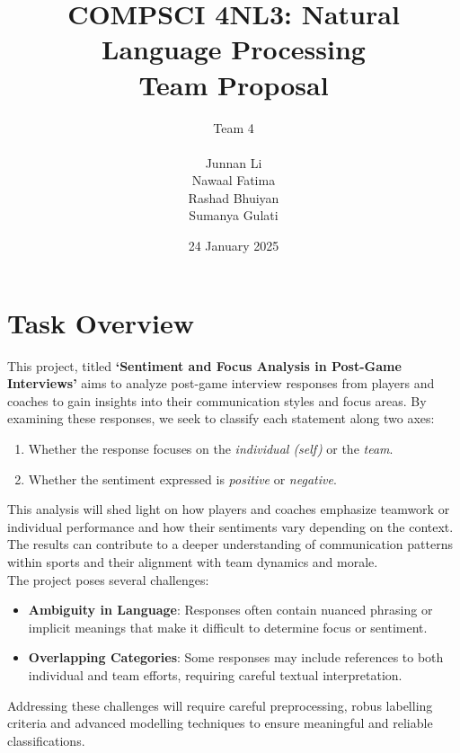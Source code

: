 \documentclass[titlepage]{article}
\title{COMPSCI 4NL3: Natural Language Processing\\
Team Proposal}
\author{Team 4\\
\\ Junnan Li
\\ Nawaal Fatima
\\ Rashad Bhuiyan
\\ Sumanya Gulati}
\date{24 January 2025}
\begin{document}
\begin{titlepage}
  \maketitle
\end{titlepage}

\newpage 

\tableofcontents
\listoftables

\newpage

\section{Task Overview}
This project, titled \textbf{`Sentiment and Focus Analysis in Post-Game Interviews'} aims to analyze post-game 
interview responses from players and coaches to gain insights into their communication styles and focus areas.
By examining these responses, we seek to classify each statement along two axes:

\begin{enumerate}
  \item Whether the response focuses on the \emph{individual (self)} or the \emph{team}.
  \item Whether the sentiment expressed is \emph{positive} or \emph{negative}.
\end{enumerate}

This analysis will shed light on how players and coaches emphasize teamwork or individual performance and how their
sentiments vary depending on the context. The results can contribute to a deeper understanding of communication
patterns within sports and their alignment with team dynamics and morale.\\

The project poses several challenges:
\begin{itemize}
  \item \textbf{Ambiguity in Language}: Responses often contain nuanced phrasing or implicit meanings 
  that make it difficult to determine focus or sentiment.
  \item \textbf{Overlapping Categories}: Some responses may include references to both individual and 
  team efforts, requiring careful textual interpretation.
\end{itemize}

Addressing these challenges will require careful preprocessing, robus labelling criteria and advanced
modelling techniques to ensure meaningful and reliable classifications.
\end{document}
